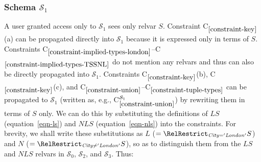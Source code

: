 \documentclass{sig-alternate-05-2015}
\newcounter{constraint}
\newcommand{\LS}{\ensuremath{\mathit{LS}}}
\newcommand{\NLS}{\ensuremath{\mathit{NLS}}}
\newcommand{\LSsub}{\ensuremath{\mathit{L}}}
\newcommand{\NLSsub}{\ensuremath{\mathit{N}}}
\newcommand{\City}{\ensuremath{\mathit{City}}}
\newcommand{\SC}[1]{\ensuremath{\mathcal{S}_{#1}}}
\newcommand{\Constraint}[2][]{C\ensuremath{_{#2}\ifx&#1&\else^{#1}\fi}}
\begin{document}




\subsubsection{Schema \(\SC{1}\)}
\label{sec-constraints-s-i}

\noindent A user granted access only to \(\SC{1}\) sees only relvar \(S\). Constraint \Constraint{\ref{constraint-key}}(a) can be propagated directly into \(\SC{1}\) because it is expressed only in terms of \(S\). Constraints \Constraint{\ref{constraint-implied-types-london}}--\Constraint{\ref{constraint-implied-types-TSSNL}} do not mention any relvars and thus can also be directly propagated into \(\SC{1}\). Constraints \Constraint{\ref{constraint-key}}(b), \Constraint{\ref{constraint-key}}(c), and \Constraint{\ref{constraint-union}}--\Constraint{\ref{constraint-tuple-types}} can be propagated to \(\SC{1}\) (written as, e.g., \Constraint[\SC{1}]{\ref{constraint-union}}) by rewriting them in terms of \(S\) only. We can do this by substituting the definitions of \(\LS\) (equation~\ref{eqn-ls}) and \(\NLS\) (equation~\ref{eqn-nls}) into the constraints. For brevity, we shall write these substitutions as \(\LSsub\) (\(= \RelRestrict_{\City = \mathit{'London'}}S\)) and \(\NLSsub\) (\(= \RelRestrict_{\City \ne \mathit{'London'}}S\)), so as to distinguish them from the \(\LS\) and \(\NLS\) relvars in \(\SC{0}\), \(\SC{2}\), and \(\SC{3}\). Thus:
\end{document}
